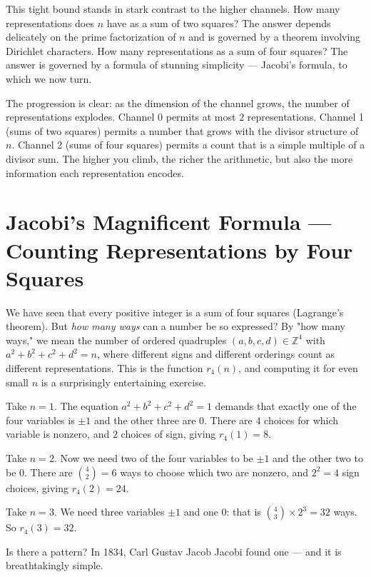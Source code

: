 This tight bound stands in stark contrast to the higher channels. How many representations does $n$ have as a sum of two squares? The answer depends delicately on the prime factorization of $n$ and is governed by a theorem involving Dirichlet characters. How many representations as a sum of four squares? The answer is governed by a formula of stunning simplicity --- Jacobi's formula, to which we now turn.

The progression is clear: as the dimension of the channel grows, the number of representations explodes. Channel 0 permits at most $2$ representations. Channel 1 (sums of two squares) permits a number that grows with the divisor structure of $n$. Channel 2 (sums of four squares) permits a count that is a simple multiple of a divisor sum. The higher you climb, the richer the arithmetic, but also the more information each representation encodes.


\bigskip


\section{Jacobi's Magnificent Formula --- Counting Representations by Four Squares}

We have seen that every positive integer is a sum of four squares (Lagrange's theorem). But \textit{how many ways} can a number be so expressed? By "how many ways," we mean the number of ordered quadruples $(a, b, c, d) \in \mathbb{Z}^4$ with $a^2 + b^2 + c^2 + d^2 = n$, where different signs and different orderings count as different representations. This is the function $r_4(n)$, and computing it for even small $n$ is a surprisingly entertaining exercise.

Take $n = 1$. The equation $a^2 + b^2 + c^2 + d^2 = 1$ demands that exactly one of the four variables is $\pm 1$ and the other three are $0$. There are $4$ choices for which variable is nonzero, and $2$ choices of sign, giving $r_4(1) = 8$.

Take $n = 2$. Now we need two of the four variables to be $\pm 1$ and the other two to be $0$. There are $\binom{4}{2} = 6$ ways to choose which two are nonzero, and $2^2 = 4$ sign choices, giving $r_4(2) = 24$.

Take $n = 3$. We need three variables $\pm 1$ and one $0$: that is $\binom{4}{3} \times 2^3 = 32$ ways. So $r_4(3) = 32$.

Is there a pattern? In 1834, Carl Gustav Jacob Jacobi found one --- and it is breathtakingly simple.

